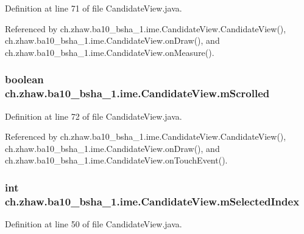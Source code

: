 Definition at line 71 of file CandidateView.java.

Referenced by ch.zhaw.ba10\_\-bsha\_\-1.ime.CandidateView.CandidateView(), ch.zhaw.ba10\_\-bsha\_\-1.ime.CandidateView.onDraw(), and ch.zhaw.ba10\_\-bsha\_\-1.ime.CandidateView.onMeasure().\hypertarget{classch_1_1zhaw_1_1ba10__bsha__1_1_1ime_1_1CandidateView_ad2ee9a4886f59f2a631043d59aeb732e}{
\subsubsection[{mScrolled}]{\setlength{\rightskip}{0pt plus 5cm}boolean {\bf ch.zhaw.ba10\_\-bsha\_\-1.ime.CandidateView.mScrolled}}}
\label{classch_1_1zhaw_1_1ba10__bsha__1_1_1ime_1_1CandidateView_ad2ee9a4886f59f2a631043d59aeb732e}


Definition at line 72 of file CandidateView.java.

Referenced by ch.zhaw.ba10\_\-bsha\_\-1.ime.CandidateView.CandidateView(), ch.zhaw.ba10\_\-bsha\_\-1.ime.CandidateView.onDraw(), and ch.zhaw.ba10\_\-bsha\_\-1.ime.CandidateView.onTouchEvent().\hypertarget{classch_1_1zhaw_1_1ba10__bsha__1_1_1ime_1_1CandidateView_a056a5bbf219465c88152d1c77a9bfd5d}{
\subsubsection[{mSelectedIndex}]{\setlength{\rightskip}{0pt plus 5cm}int {\bf ch.zhaw.ba10\_\-bsha\_\-1.ime.CandidateView.mSelectedIndex}}}
\label{classch_1_1zhaw_1_1ba10__bsha__1_1_1ime_1_1CandidateView_a056a5bbf219465c88152d1c77a9bfd5d}


Definition at line 50 of file CandidateView.java.

